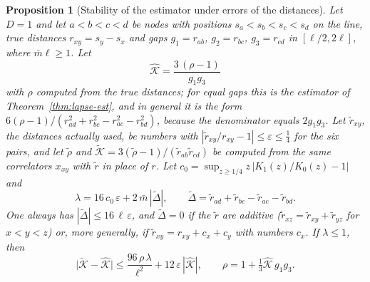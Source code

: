 \documentclass[11pt,a4paper]{article}
\theoremstyle{stmt}
\newtheorem{proposition}[theorem]{Proposition}
\theoremstyle{defn}
\theoremstyle{rmk}
\numberwithin{equation}{section}
\begin{document}
{\begin{proposition}[Stability of the estimator under errors of the distances]\label{prop:lapse-stab}
Let $D=1$ and let $a<b<c<d$ be nodes with positions $s_a<s_b<s_c<s_d$ on the line, true distances $r_{xy}=s_y-s_x$ and gaps $g_1=r_{ab}$, $g_2=r_{bc}$, $g_3=r_{cd}$ in $[\ell/2,2\ell]$, where $\bar m\ell\ge1$. Let
\[
\hat{\mathcal K}=\frac{3\,(\rho-1)}{g_1g_3}
\]
with $\rho$ computed from the true distances; for equal gaps this is the estimator of Theorem~\ref{thm:lapse-est}, and in general it is the form $6(\rho-1)/(r_{ad}^2+r_{bc}^2-r_{ac}^2-r_{bd}^2)$, because the denominator equals $2g_1g_3$. Let $\tilde r_{xy}$, the distances actually used, be numbers with $|\tilde r_{xy}/r_{xy}-1|\le\varepsilon\le\frac14$ for the six pairs, and let $\tilde\rho$ and $\tilde{\mathcal K}=3(\tilde\rho-1)/(\tilde r_{ab}\tilde r_{cd})$ be computed from the same correlators $x_{xy}$ with $\tilde r$ in place of $r$. Let $c_0=\sup_{z\ge1/4}z\,|K_1(z)/K_0(z)-1|$ and
\[
\lambda=16\,c_0\,\varepsilon+2\,\bar m\,|\tilde\Delta|,\qquad\tilde\Delta=\tilde r_{ad}+\tilde r_{bc}-\tilde r_{ac}-\tilde r_{bd} .
\]
One always has $|\tilde\Delta|\le16\,\ell\,\varepsilon$, and $\tilde\Delta=0$ if the $\tilde r$ are additive ($\tilde r_{xz}=\tilde r_{xy}+\tilde r_{yz}$ for $x<y<z$) or, more generally, if $\tilde r_{xy}=r_{xy}+c_x+c_y$ with numbers $c_x$.
If $\lambda\le1$, then
\[
\big|\tilde{\mathcal K}-\hat{\mathcal K}\big|\le\frac{96\,\rho\,\lambda}{\ell^2}+12\,\varepsilon\,|\hat{\mathcal K}|,\qquad\rho=1+\tfrac13\hat{\mathcal K}\,g_1g_3 .
\]
\end{proposition}

}
\end{document}
